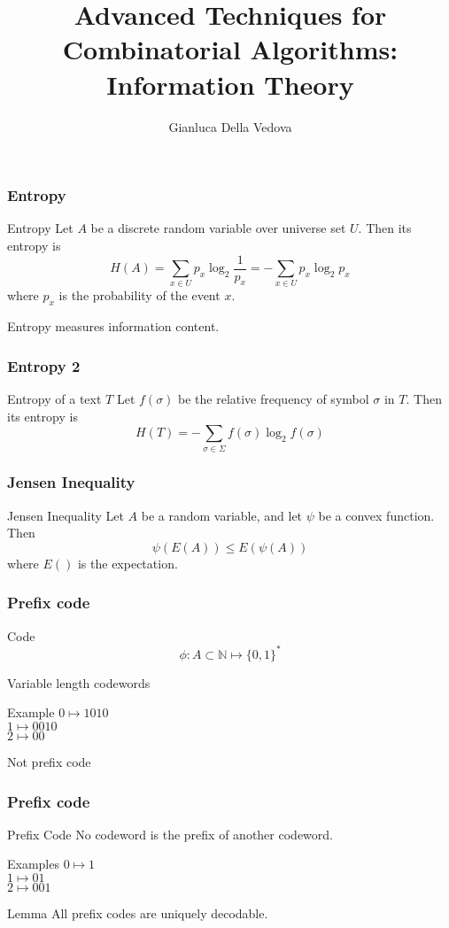 \documentclass[12pt,aspectratio=169]{beamer}
\author{Gianluca Della Vedova}
\title[Advanced Algorithms]{Advanced Techniques for Combinatorial Algorithms:
Information Theory }
\institute[]{Univ. Milano -- Bicocca\\
  \texttt{https://gianluca.dellavedova.org}}
\begin{document}
\begin{frame}
  \titlepage
\end{frame}




\begin{frame}\frametitle{Entropy}
\begin{block}{Entropy}
Let $A$ be a discrete random variable over universe set $U$.    
Then its entropy is 
\[H(A) = \sum_{x\in U} p_{x} \log_{2} \frac{1}{p_{x}} = - \sum_{x\in U} p_{x} \log_{2} p_{x} \]
where $p_{x}$ is the probability of the event $x$.    
\end{block}

Entropy measures information content.    
\end{frame}

\begin{frame}\frametitle{Entropy 2}
\begin{block}{Entropy of a text $T$}
Let $f(\sigma)$ be the relative frequency of symbol $\sigma$ in $T$.    
Then its entropy is 
\[H(T) = - \sum_{\sigma\in \Sigma} f(\sigma) \log_{2} f(\sigma) \]
\end{block}
\end{frame}

\begin{frame}\frametitle{Jensen Inequality}
\begin{block}{Jensen Inequality}
Let $A$ be a random variable, and let $\psi$ be a convex function.    
Then 
\[\psi(E(A)) \le E(\psi(A))\]
where $E()$ is the expectation.    
\end{block}
\end{frame}

\begin{frame}\frametitle{Prefix code}
\begin{block}{Code}
\[\phi : A \subset \mathbb{N} \mapsto \{0,1\}^{*}\]
\end{block}

\alert{Variable} length codewords

\begin{block}{Example}
$0 \mapsto 1010$\\
$1 \mapsto 0010$\\
$2 \mapsto 00$
\end{block}

\alert{Not} prefix code
\end{frame}

\begin{frame}\frametitle{Prefix code}
\begin{block}{Prefix Code}
No codeword is the prefix of another codeword.    
\end{block}

\begin{block}{Examples}
$0 \mapsto 1$\\
$1 \mapsto 01$\\
$2 \mapsto 001$
\end{block}


\begin{block}{Lemma}
All prefix codes are uniquely decodable.    
\end{block}
\end{frame}
\end{document}
